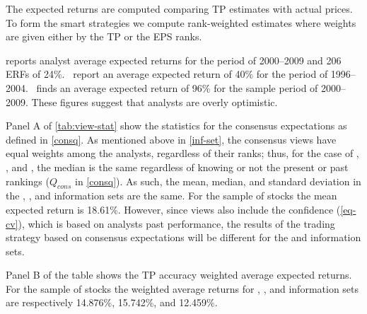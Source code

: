 \documentclass[a4paper,12pt,openright,notitlepage]{report}\usepackage[]{graphicx}\usepackage[]{color}
\begin{document}
The expected returns  are computed comparing TP estimates with actual prices. To form the smart strategies we compute rank-weighted estimates where weights are given either by the TP or the EPS ranks.

\cite{bradshaw2002} reports analyst average expected returns for the period of 2000--2009 and 206 ERFs of 24\%.~\cite{da2011} report an average expected return of 40\% for the period of 1996--2004.~\cite{zhou2013} finds an average expected return of 96\% for the sample period of 2000--2009. These figures suggest that analysts are overly optimistic.

Panel A of \ref{tab:view-stat} show the statistics for the consensus expectations as defined in \ref{consq}. As mentioned above in \ref{inf-set}, the consensus views have equal weights among the analysts, regardless of their ranks; thus, for the case of \tr{}, \naive{}, and , the median is the same regardless of knowing or not the present or past rankings ($Q_{cons}$ in  \ref{consq}). As such, the mean, median, and standard deviation in the \tr{}, \naive{}, and  information sets are the same. For the sample of \all{} stocks the mean expected return is 18.61\%. However, since views also include the confidence (\ref{eq-cv}), which is based on analysts past performance, the results of the trading strategy based on consensus expectations will be different for the \naive{} and  information sets.


Panel B of the table shows the TP accuracy weighted average expected returns. For the sample of \all{} stocks the weighted average returns for \tr{}, \naive{}, and  information sets are respectively 14.876\%, 15.742\%, and 12.459\%.

\end{document}
